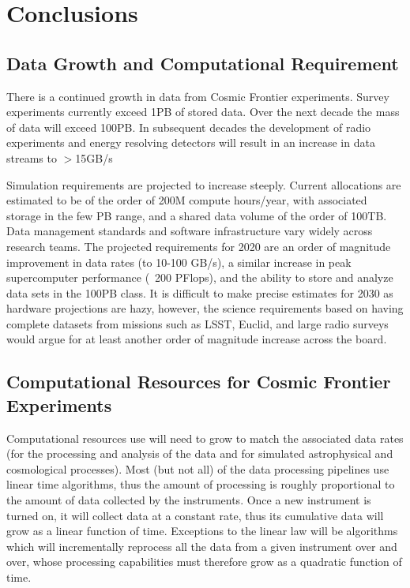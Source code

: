 \section{Conclusions}

\subsection{Data Growth and Computational Requirement}
There is a continued growth in data from Cosmic Frontier
experiments. Survey experiments currently exceed 1PB of stored
data. Over the next decade the mass of data will exceed 100PB. In
subsequent decades the development of radio experiments and energy
resolving detectors will result in an increase in data streams to
$>$15GB/s

Simulation requirements are projected to increase steeply. Current
allocations are estimated to be of the order of 200M compute
hours/year, with associated storage in the few PB range, and a shared
data volume of the order of 100TB. Data management standards and
software infrastructure vary widely across research teams. The
projected requirements for 2020 are an order of magnitude improvement
in data rates (to 10-100 GB/s), a similar increase in peak
supercomputer performance (~200 PFlops), and the ability to store and
analyze data sets in the 100PB class. It is difficult to make precise
estimates for 2030 as hardware projections are hazy, however, the
science requirements based on having complete datasets from missions
such as LSST, Euclid, and large radio surveys would argue for at least
another order of magnitude increase across the board.

\subsection{Computational Resources for Cosmic Frontier Experiments}
Computational resources use will need to grow to match the associated
data rates (for the processing and analysis of the data and for
simulated astrophysical and cosmological processes). Most (but not
all) of the data processing pipelines use linear time algorithms, thus
the amount of processing is roughly proportional to the amount of data
collected by the instruments. Once a new instrument is turned on, it
will collect data at a constant rate, thus its cumulative data will
grow as a linear function of time. Exceptions to the linear law will
be algorithms which will incrementally reprocess all the data from a
given instrument over and over, whose processing capabilities must
therefore grow as a quadratic function of time.

